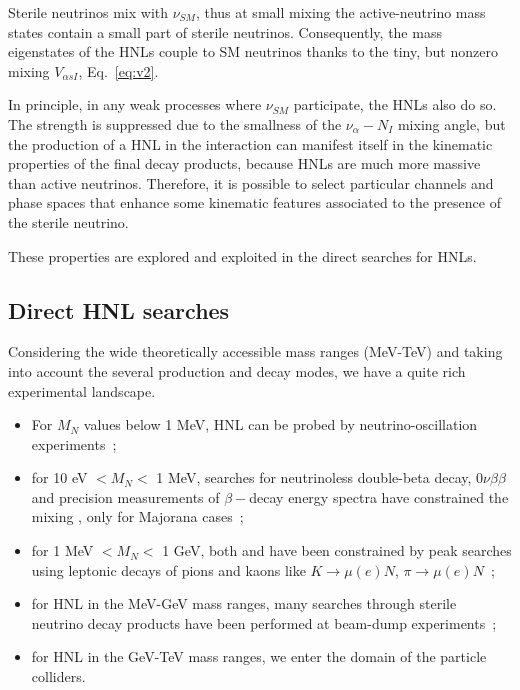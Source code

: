 Sterile neutrinos mix with $\nu_{SM}$, thus at small mixing the
active-neutrino mass states contain a small part of sterile
neutrinos. Consequently, the mass eigenstates of the HNLs couple to SM
neutrinos thanks to the tiny, but nonzero mixing $V_{\alpha sI}$, Eq.~\ref{eq:v2}.

In principle, in any weak processes where $\nu_{SM}$ participate, the
HNLs also do so. The strength is suppressed due to the smallness of
the $\nu_\alpha - N_I$ mixing angle,
but the production of a HNL in the interaction can manifest itself in the kinematic properties of the final decay products, because HNLs are much more massive than active neutrinos.
Therefore, it is possible to select particular channels and phase spaces that enhance some kinematic features associated to the presence of the sterile neutrino.

These properties are explored and exploited in the direct searches for HNLs.



\subsection{Direct HNL searches}\label{sec:c3directHNL}
Considering the wide theoretically accessible mass ranges (MeV-TeV) and taking into account
the several production and decay modes, we have a quite rich
experimental landscape. 
\begin{itemize}
\item For $M_N$ values below 1 MeV, HNL can be probed by
  neutrino-oscillation experiments~\cite{de_Gouv_a_2005};
\item for 10 eV $< M_N <$ 1 MeV, searches for neutrinoless double-beta decay,
  $0\nu\beta\beta$ and precision measurements of $\beta-$decay energy
  spectra have constrained the mixing \mixpare, only for Majorana cases~\cite{Deppisch_2015};
\item for 1 MeV $< M_N <$ 1 GeV, both \mixpare and \mixparm have been
  constrained by peak searches using leptonic decays of pions
  and kaons like $K \rightarrow \mu(e) N$, $\pi \rightarrow \mu(e)
  N$~\cite{Liventsev_2013};
\item for HNL in the MeV-GeV mass ranges, many searches through
  sterile neutrino decay products have been performed at beam-dump experiments~\cite{DORENBOSCH1986473};
\item for HNL in the GeV-TeV mass ranges, we enter the domain of
  the particle colliders.
\end{itemize}

